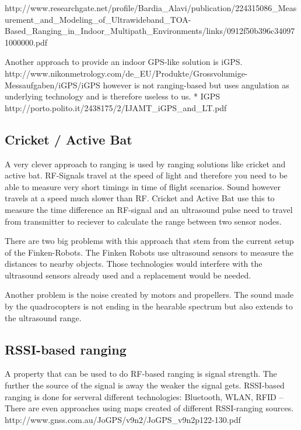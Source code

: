 http://www.researchgate.net/profile/Bardia\_Alavi/publication/224315086\_Measurement\_and\_Modeling\_of\_Ultrawideband\_TOA-Based\_Ranging\_in\_Indoor\_Multipath\_Environments/links/0912f50b396c340971000000.pdf 

Another approach to provide an indoor GPS-like solution is iGPS. http://www.nikonmetrology.com/de\_EU/Produkte/Grossvolumige-Messaufgaben/iGPS/iGPS  however is not ranging-based but uses angulation as underlying technology and is therefore useless to us.
  * IGPS http://porto.polito.it/2438175/2/IJAMT\_iGPS\_and\_LT.pdf
\subsection{Cricket / Active Bat}
A very clever approach to ranging is used by ranging solutions like cricket and active bat. 
RF-Signals travel at the speed of light and therefore you need to be able to measure very short timings in time of flight scenarios.
Sound however travels at a speed much slower than RF.
Cricket and Active Bat use this to measure the time difference an RF-signal and an ultrasound pulse need to travel from transmitter to reciever to calculate the range between two sensor nodes. 



There are two big problems with this approach that stem from the current setup of the Finken-Robots.
The Finken Robots use ultrasound sensors to measure the distances to nearby objects.
Those technologies would interfere with the ultrasound sensors already used and a replacement would be needed.

Another problem is the noise created by motors and propellers.
The sound made by the quadrocopters is not ending in the hearable spectrum but also extends to the ultrasound range.

\subsection{RSSI-based ranging}

A property that can be used to do RF-based ranging is signal strength.
The further the source of the signal is away the weaker the signal gets.
RSSI-based ranging is done for serveral different technologies: Bluetooth, WLAN, RFID –
There are even approaches using maps created of different RSSI-ranging sources. http://www.gnss.com.au/JoGPS/v9n2/JoGPS\_v9n2p122-130.pdf 

